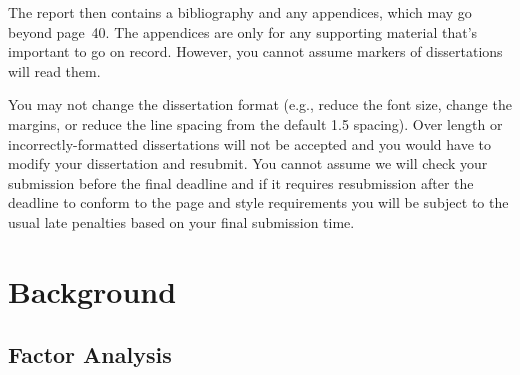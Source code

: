 \documentclass[msc,deptreport.inf]{infthesis} %
\begin{document}
The report then contains a bibliography and any appendices, which may go beyond
page~40. The appendices are only for any supporting material that's important to
go on record. However, you cannot assume markers of dissertations will read them.

You may not change the dissertation format (e.g., reduce the font
size, change the margins, or reduce the line spacing from the default
1.5 spacing). Over length or incorrectly-formatted dissertations will
not be accepted and you would have to modify your dissertation and
resubmit.  You cannot assume we will check your submission before the
final deadline and if it requires resubmission after the deadline to
conform to the page and style requirements you will be subject to the
usual late penalties based on your final submission time.

%
%
%
%
%
%


\chapter{Background}\label{ch:background}

\section{Factor Analysis}\label{sec:fa}
\end{document}
